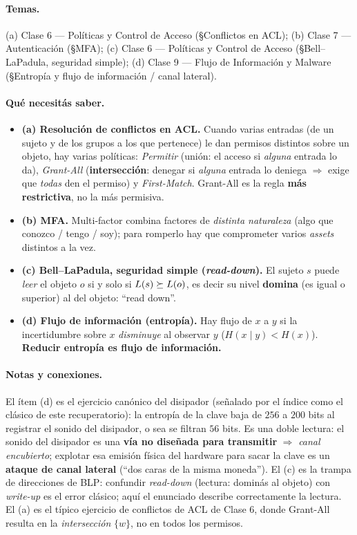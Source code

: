 \paragraph{Temas.}
(a) Clase 6 — Políticas y Control de Acceso (\S Conflictos en ACL);
(b) Clase 7 — Autenticación (\S MFA);
(c) Clase 6 — Políticas y Control de Acceso (\S Bell--LaPadula, seguridad simple);
(d) Clase 9 — Flujo de Información y Malware (\S Entropía y flujo de información / canal lateral).

\paragraph{Qué necesitás saber.}
\begin{itemize}
  \item \textbf{(a) Resolución de conflictos en ACL.} Cuando varias entradas (de un sujeto y de
  los grupos a los que pertenece) le dan permisos distintos sobre un objeto, hay varias políticas:
  \emph{Permitir} (unión: el acceso si \emph{alguna} entrada lo da), \emph{Grant-All}
  (\textbf{intersección}: denegar si \emph{alguna} entrada lo deniega $\Rightarrow$ exige que
  \emph{todas} den el permiso) y \emph{First-Match}. Grant-All es la regla \textbf{más restrictiva},
  no la más permisiva.
  \item \textbf{(b) MFA.} Multi-factor combina factores de \emph{distinta naturaleza} (algo que
  conozco / tengo / soy); para romperlo hay que comprometer varios \emph{assets} distintos a la vez.
  \item \textbf{(c) Bell--LaPadula, seguridad simple (\emph{read-down}).} El sujeto $s$ puede
  \emph{leer} el objeto $o$ si y solo si $L(s) \succeq L(o)$, es decir su nivel \textbf{domina}
  (es igual o superior) al del objeto: ``read down''.
  \item \textbf{(d) Flujo de información (entropía).} Hay flujo de $x$ a $y$ si la incertidumbre
  sobre $x$ \emph{disminuye} al observar $y$ ($H(x\mid y) < H(x)$). \textbf{Reducir entropía es
  flujo de información.}
\end{itemize}

\paragraph{Notas y conexiones.}
El ítem (d) es el ejercicio canónico del disipador (señalado por el índice como el clásico de este
recuperatorio): la entropía de la clave baja de $256$ a $200$ bits al registrar el sonido del
disipador, o sea se filtran $56$ bits. Es una doble lectura: el sonido del disipador es una
\textbf{vía no diseñada para transmitir} $\Rightarrow$ \emph{canal encubierto}; explotar esa
emisión física del hardware para sacar la clave es un \textbf{ataque de canal lateral}
(``dos caras de la misma moneda''). El (c) es la trampa de direcciones de BLP: confundir
\emph{read-down} (lectura: dominás al objeto) con \emph{write-up} es el error clásico; aquí el
enunciado describe correctamente la lectura. El (a) es el típico ejercicio de conflictos de ACL
de Clase 6, donde Grant-All resulta en la \emph{intersección} $\{w\}$, no en todos los
permisos.


